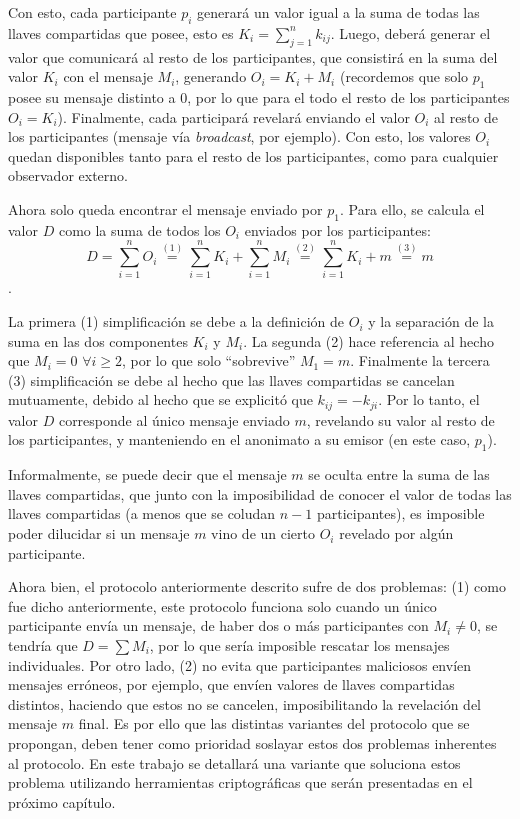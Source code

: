 Con esto, cada participante $p_i$ generará un valor igual a la suma de todas las llaves compartidas que posee, esto es $K_i = \sum_{j=1}^n k_{ij}$. Luego, deberá generar el valor que comunicará al resto de los participantes, que consistirá en la suma del valor $K_i$ con el mensaje $M_i$, generando $O_i = K_i + M_i$ (recordemos que solo $p_1$ posee su mensaje distinto a 0, por lo que para el todo el resto de los participantes $O_i = K_i$). Finalmente, cada participará revelará enviando el valor $O_i$ al resto de los participantes (mensaje vía \emph{broadcast}, por ejemplo). Con esto, los valores $O_i$ quedan disponibles tanto para el resto de los participantes, como para cualquier observador externo.

Ahora solo queda encontrar el mensaje enviado por $p_1$. Para ello, se calcula el valor $D$ como la suma de todos los $O_i$ enviados por los participantes: $$D = \sum_{i=1}^n O_i \overset{(1)}{=} \sum_{i=1}^n K_i + \sum_{i=1}^n M_i \overset{(2)}{=} \sum_{i=1}^n K_i + m \overset{(3)}{=} m$$.

La primera (1) simplificación se debe a la definición de $O_i$ y la separación de la suma en las dos componentes $K_i$ y $M_i$. La segunda (2) hace referencia al hecho que $M_i = 0$ $\forall i \geq 2$, por lo que solo ``sobrevive'' $M_1 = m$. Finalmente la tercera (3) simplificación se debe al hecho que las llaves compartidas se cancelan mutuamente, debido al hecho que se explicitó que $k_{ij} = -k_{ji}$. Por lo tanto, el valor $D$ corresponde al único mensaje enviado $m$, revelando su valor al resto de los participantes, y manteniendo en el anonimato a su emisor (en este caso, $p_1$).


Informalmente, se puede decir que el mensaje $m$ se oculta entre la suma de las llaves compartidas, que junto con la imposibilidad de conocer el valor de todas las llaves compartidas (a menos que se coludan $n-1$ participantes), es imposible poder dilucidar si un mensaje $m$ vino de un cierto $O_i$ revelado por algún participante.

Ahora bien, el protocolo anteriormente descrito sufre de dos problemas: (1) como fue dicho anteriormente, este protocolo funciona solo cuando un único participante envía un mensaje, de haber dos o más participantes con $M_i \neq 0$, se tendría que $D = \sum M_i$, por lo que sería imposible rescatar los mensajes individuales. Por otro lado, (2) no evita que participantes maliciosos envíen mensajes erróneos, por ejemplo, que envíen valores de llaves compartidas distintos, haciendo que estos no se cancelen, imposibilitando la revelación del mensaje $m$ final. Es por ello que las distintas variantes del protocolo que se propongan, deben tener como prioridad soslayar estos dos problemas inherentes al protocolo. En este trabajo se detallará una variante que soluciona estos problema utilizando herramientas criptográficas que serán presentadas en el próximo capítulo.

